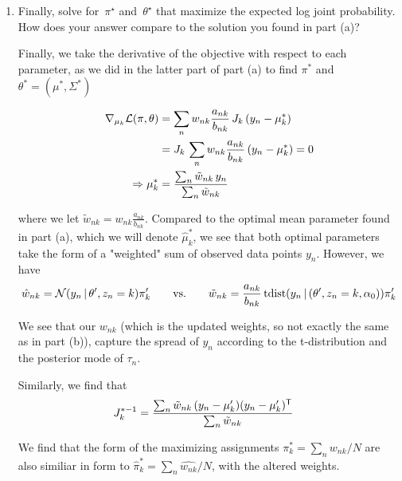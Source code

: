 \begin{enumerate}[label=(\alph*)]
\begin{solution}
\end{solution}

\clearpage
\item Finally, solve for~$\pi^\star$ and~$\theta^\star$ that maximize the expected log joint probability.  How does your answer compare to the solution you found in part (a)?

\begin{solution}
Finally, we take the derivative of the objective with respect to each parameter, as we did in the latter part of part (a) to find
$\pi^*$ and $\theta^* = (\mu^*, \Sigma^*)$

\begin{align*}
    \nabla_{\mu_k} \mathcal{L}(\pi, \theta)
        &= \sum_n w_{nk}\frac{a_{nk}}{b_{nk}}\, J_k\,(y_n-\mu_k^*) \\
        &= J_k\,\sum_n w_{nk}\frac{a_{nk}}{b_{nk}}\, (y_n-\mu_k^*) = 0 \\
    \Rightarrow \mu_k^* &= \frac{\sum_n \tilde{w}_{nk}\,y_n}{\sum_n \tilde{w}_{nk}}
\end{align*}

where we let $\tilde{w}_{nk} = w_{nk} \frac{a_{nk}}{b_{nk}}$. Compared to the optimal mean parameter found in part (a), which we will denote $\hat{\mu}_k^*$, we see that both optimal parameters take the form of a "weighted" sum of observed data points $y_n$. However, we have
\begin{equation*}
    \hat{w}_{nk} = \mathcal{N}(y_n\,|\, \theta', z_n=k)\pi_k'
        \qquad\textrm{vs.}\qquad
    \tilde{w}_{nk} = \frac{a_{nk}}{b_{nk}}\,
        \mathrm{tdist}(y_n\,|\,(\theta', z_n=k, \alpha_0))\pi_k'
\end{equation*}

We see that our $w_{nk}$ (which is the updated weights, so not exactly the same as in part (b)), capture the spread of $y_n$ according to the t-distribution and the posterior mode of $\tau_n$.

Similarly, we find that
\begin{align*}
    J_k^{*-1}
        &= \frac{\sum_n \tilde{w}_{nk}\,(y_n-\mu_k')(y_n-\mu_k')^{\mathsf{T}}}
        {\sum_n \tilde{w}_{nk}}
\end{align*}

We find that the form of the maximizing assignments $\pi_k^*=\sum_n w_{nk}/N$ are also similiar in form to $\hat{\pi}_k^* = \sum_n \hat{w_{nk}}/N$, with the altered weights.

\end{solution}

\end{enumerate}
